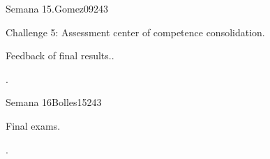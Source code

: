 \begin{syllabus}
\begin{unit}{Semana 15.}{Gomez09}{24}{3}
   \begin{topics}
      \item Challenge 5: Assessment center of competence consolidation.
      \item Feedback of final results..
   \end{topics}

   \begin{unitgoals}
      \item . 
     
   \end{unitgoals}
\end{unit}

\begin{unit}{Semana 16}{Bolles15}{24}{3}
   \begin{topics}
      \item  Final exams.
   \end{topics}

   \begin{unitgoals}
      \item .
   \end{unitgoals}
\end{unit}

\begin{coursebibliography}
\end{coursebibliography}

\end{syllabus}
